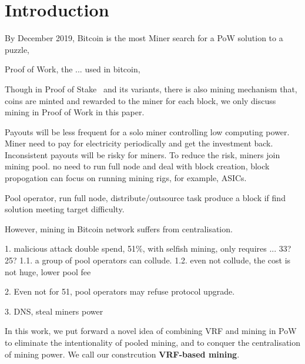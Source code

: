 \section{Introduction}

By December 2019, Bitcoin is the most 
Miner search for a PoW solution to a puzzle, 

Proof of Work, the ... used in bitcoin, 



Though in Proof of Stake~\cite{} and its variants, there is also mining mechanism that, coins are minted and rewarded to the miner for each block, we only discuss mining in Proof of Work in this paper.


Payouts will be less frequent for a solo miner controlling low computing power. Miner need to pay for electricity periodically and get the investment back.
Inconsistent payouts will be risky for miners.
To reduce the risk, miners join mining pool.
no need to run full node and deal with block creation, block propogation
can focus on running mining rigs, for example, ASICs.

Pool operator, run full node, distribute/outsource task
produce a block if find solution meeting target difficulty.

However, mining in Bitcoin network suffers from centralisation.




1. malicious attack
double spend, 51\%, with selfish mining, only requires ... 33?25?
1.1. a group of pool operators can collude.
1.2. even not collude, the cost is not huge, lower pool fee

2. Even not for 51, 
pool operators may refuse protocol upgrade. 


3. DNS, steal miners power


In this work, we put forward a novel idea of combining VRF and mining in PoW to eliminate the intentionality of pooled mining, and to conquer the centralisation of mining power. We call our constrcution \textbf{VRF-based mining}.